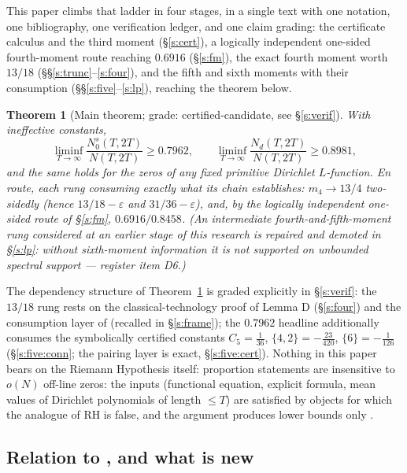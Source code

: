 \documentclass[11pt]{article}
\numberwithin{equation}{section}
\newtheorem{theorem}{Theorem}[section]
\theoremstyle{definition}
\theoremstyle{remark}
\begin{document}
This paper climbs that ladder in four stages, in a single
text with one notation, one bibliography, one verification
ledger, and one claim grading: the certificate calculus and the
third moment (\S\ref{s:cert}), a logically independent
one-sided fourth-moment route reaching $0.6916$ (\S\ref{s:fm}),
the exact fourth moment worth $13/18$
(\S\S\ref{s:trunc}--\ref{s:four}), and the fifth and sixth
moments with their consumption
(\S\S\ref{s:five}--\ref{s:lp}), reaching the theorem
below.

\begin{theorem}[Main theorem; grade: certified-candidate, see
\S\ref{s:verif}]\label{t:main}
With ineffective constants,
\[
\liminf_{T\to\infty}\frac{N_0^{s}(T,2T)}{N(T,2T)}\ge 0.7962,
\qquad
\liminf_{T\to\infty}\frac{N_d(T,2T)}{N(T,2T)}\ge 0.8981,
\]
and the same holds for the zeros of any fixed primitive Dirichlet
$L$-function. En route, each rung consuming exactly what its
chain establishes: $m_4\to13/4$ two-sidedly (hence
$13/18-\varepsilon$ and $31/36-\varepsilon$), and, by the
logically independent one-sided route of \S\ref{s:fm},
$0.6916/0.8458$. (An intermediate fourth-and-fifth-moment rung considered at
an earlier stage of this research is repaired and demoted in
\S\ref{s:lp}: without sixth-moment information it is not
supported on unbounded spectral support --- register item D6.)
\end{theorem}

The dependency structure of Theorem~\ref{t:main} is graded
explicitly in \S\ref{s:verif}: the $13/18$ rung rests on the
classical-technology proof of Lemma D (\S\ref{s:four}) and
the consumption layer of \cite{C26} (recalled in
\S\ref{s:frame}); the $0.7962$ headline
additionally consumes the symbolically certified constants
$C_5=\tfrac1{36}$, $\{4,2\}=-\tfrac{23}{420}$,
$\{6\}=-\tfrac1{126}$ (\S\ref{s:five:conn}; the pairing
layer is exact, \S\ref{s:five:cert}). Nothing in this paper bears on the Riemann Hypothesis
itself: proportion statements are insensitive to $o(N)$ off-line
zeros: the inputs (functional equation, explicit formula, mean
values of Dirichlet polynomials of length $\le T$) are satisfied
by objects for which the analogue of RH is false, and the
argument produces lower bounds only \cite[\S1.5]{C26}.

\subsection*{Relation to \cite{C26}, and what is new}
\end{document}
